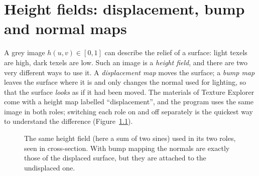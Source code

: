 \chapter{Height fields: displacement, bump and normal maps}
\label{ch:height}

A grey image $h(u,v)\in[0,1]$ can describe the relief of a surface: light texels are high,
dark texels are low. Such an image is a \emph{height field}, and there are two very different
ways to use it. A \emph{displacement map} moves the surface; a \emph{bump map} leaves the
surface where it is and only changes the normal used for lighting, so that the surface
\emph{looks} as if it had been moved. The materials of Texture Explorer come with a height
map labelled ``displacement'', and the program uses the same image in both roles; switching
each role on and off separately is the quickest way to understand the difference
(Figure~\ref{fig:bumpvsdisp}).

\begin{figure}[ht]
\centering
{}
\caption{The same height field (here a sum of two sines) used in its two roles, seen in
cross-section. With bump mapping the normals are exactly those of the displaced surface,
but they are attached to the undisplaced one.}
\label{fig:bumpvsdisp}
\end{figure}


